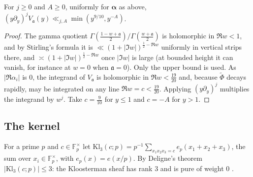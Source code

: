 \documentclass[11pt,colorlinks]{charlie}
\newcommand{\F}{\mathbb{F}}
\begin{document}
\begin{lemma}\label{lem:dualweight}
For $j\ge0$ and $A\ge0$, uniformly for $\boldsymbol\alpha$ as above, $(y\partial_y)^jV_{\mathfrak a}(y)\ll_{j,A}\min(y^{9/10},y^{-A})$.
\end{lemma}
\begin{proof}
The gamma quotient $\Gamma(\frac{1-w+\mathfrak a}2)/\Gamma(\frac{w+\mathfrak a}2)$ is holomorphic in $\Re w<1$, and by Stirling's formula it is $\ll(1+|\Im w|)^{\frac12-\Re w}$ uniformly in vertical strips there, and $\asymp(1+|\Im w|)^{\frac12-\Re w}$ once $|\Im w|$ is large (at bounded height it can vanish, for instance at $w=0$ when $\mathfrak a=0$). Only the upper bound is used. As $|\Re\alpha_i|$ is $0$, the integrand of $V_{\mathfrak a}$ is holomorphic in $\Re w<\frac{19}{20}$ and, because $\widetilde\Phi$ decays rapidly, may be integrated on any line $\Re w=c<\frac{19}{20}$. Applying $(y\partial_y)^j$ multiplies the integrand by $w^j$. Take $c=\frac9{10}$ for $y\le1$ and $c=-A$ for $y>1$.
\end{proof}

\subsection{The kernel}
For a prime $p$ and $c\in\F_p^\times$ let $\mathrm{Kl}_3(c;p)=p^{-1}\sum_{x_1x_2x_3=c}e_p(x_1+x_2+x_3)$, the sum over $x_i\in\F_p^\times$, with $e_p(x)=e(x/p)$. By Deligne's theorem $|\mathrm{Kl}_3(c;p)|\le3$: the Kloosterman sheaf has rank $3$ and is pure of weight $0$ \cite[4.1.1]{GKM}.
\end{document}
